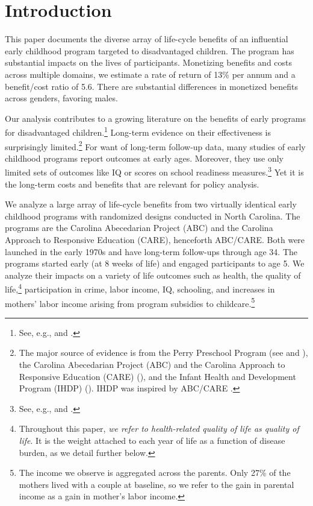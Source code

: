 \clearpage

\restoregeometry
\doublespacing

\setcounter{page}{0}

\section{Introduction}

This paper documents the diverse array of life-cycle benefits of an influential early childhood program targeted to disadvantaged children. The program has substantial impacts on the lives of participants. Monetizing benefits and costs across multiple domains, we estimate a rate of return of 13\% per annum and a benefit/cost ratio of 5.6. There are substantial differences in monetized benefits across genders, favoring males.

Our analysis contributes to a growing literature on the benefits of early programs for disadvantaged children.\footnote{See, e.g., \cite{Currie_2011_AER} and \cite{Elango_Hojman_etal_2016_Early-Edu}.} Long-term evidence on their effectiveness is surprisingly limited.\footnote{The major source of evidence is from the Perry Preschool Program (see \citealp{Schweinhart_Montie_ea_2005_BOOKlifetime} and \citealp{Heckman_Moon_etal_2010_RateofReturn,Heckman_Moon_etal_2010_QE}), the Carolina Abecedarian Project (ABC) and the Carolina Approach to Responsive Education (CARE) (\citealp{Ramey_Campbell_etal_2000_ADS,Ramey-etal_2012-ABC}), and the Infant Health and Development Program (IHDP) (\citealp{Gross_Spiker_etal_1997_BOOKHelpinglowbirth,Duncan_Sojourner_2013_JHR}). IHDP was inspired by ABC/CARE \citep[][]{Gross_Spiker_etal_1997_BOOKHelpinglowbirth}.} For want of long-term follow-up data, many studies of early childhood programs report outcomes at early ages. Moreover, they use only limited sets of outcomes like IQ or scores on school readiness measures.\footnote{See, e.g., \cite{Kline_Walters_2016_QJE} and \cite{Weiland_2013_CD_Impacts-of-Pre-K}.} Yet it is the long-term costs and benefits that are relevant for policy analysis.

We analyze a large array of life-cycle benefits from two virtually identical early childhood programs with randomized designs conducted in North Carolina. The programs are the Carolina Abecedarian Project (ABC) and the Carolina Approach to Responsive Education (CARE), henceforth ABC/CARE. Both were launched in the early 1970s and have long-term follow-ups through age 34. The programs started early (at 8 weeks of life) and engaged participants to age 5. We analyze their impacts on a variety of life outcomes such as health, the quality of life,\footnote{Throughout this paper, \textit{we refer to health-related quality of life as quality of life}. It is the weight attached to each year of life as a function of disease burden, as we detail further below.} participation in crime, labor income, IQ, schooling, and increases in mothers' labor income arising from program subsidies to childcare.\footnote{The income we observe is aggregated across the parents. Only 27\% of the mothers lived with a couple at baseline, so we refer to the gain in parental income as a gain in mother's labor income.}

